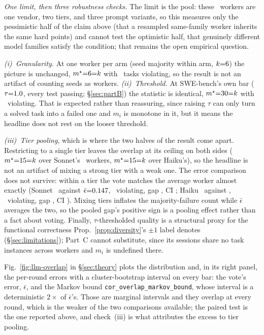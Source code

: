 \emph{One limit, then three robustness checks.} The limit is the pool: these \statPBOverlapK\ workers are one vendor, two tiers, and three prompt variants, so this measures only the pessimistic half of the claim above (that a resampled same-family worker inherits the same hard points) and cannot test the optimistic half, that genuinely different model families satisfy the condition; that remains the open empirical question.

\emph{(i)~Granularity.} At one worker per arm (seed majority within arm, $k{=}6$) the picture is unchanged, $m^\star{=}6{=}k$ with \statPBOverlapArmViolate\ tasks violating, so the result is not an artifact of counting seeds as workers. \emph{(ii)~Threshold.} At SWE-bench's own bar ($\tau{=}1.0$, every test passing; \S\ref{sec:partB}) the statistic is identical, $m^\star{=}30{=}k$ with \statPBOverlapViolateResolved\ violating. That is expected rather than reassuring, since raising $\tau$ can only turn a solved task into a failed one and $m_i$ is monotone in it, but it means the headline does not rest on the looser threshold.

\emph{(iii)~Tier pooling}, which is where the two halves of the result come apart. Restricting to a single tier leaves the overlap at its ceiling on both sides ($m^\star{=}15{=}k$ over Sonnet's \statPBOverlapTierK\ workers, $m^\star{=}15{=}k$ over Haiku's), so the headline is not an artifact of mixing a strong tier with a weak one. The error comparison does not survive: within a tier the vote matches the average worker almost exactly (Sonnet \statPBOverlapSonnetVoteErr\ against $\bar{\epsilon}{=}0.147$, \statPBOverlapSonnetViolate\ violating, gap \statPBOverlapSonnetGap, CI \statPBOverlapSonnetGapCI; Haiku \statPBOverlapHaikuVoteErr\ against \statPBOverlapHaikuEpsBar, \statPBOverlapHaikuViolate\ violating, gap \statPBOverlapHaikuGap, CI \statPBOverlapHaikuGapCI). Mixing tiers inflates the majority-failure count while $\bar{\epsilon}$ averages the two, so the pooled gap's positive sign is a pooling effect rather than a fact about voting. Finally, $\tau$-thresholded quality is a structural proxy for the functional correctness Prop.~\ref{prop:diversity}'s $\pm1$ label denotes (\S\ref{sec:limitations}); Part~C cannot substitute, since its sessions share no task instances across workers and $m_i$ is undefined there.

Fig.~\ref{fig:llm-overlap} in \S\ref{sec:theory} plots the distribution and, in its right panel, the per-round errors with a cluster-bootstrap interval on every bar: the vote's error, $\bar\epsilon$, and the Markov bound \texttt{cor\_overlap\_markov\_bound}, whose interval is a deterministic $2\times$ of $\bar\epsilon$'s. Those are marginal intervals and they overlap at every round, which is the weaker of the two comparisons available; the paired test is the one reported above, and check~(iii) is what attributes the excess to tier pooling.

